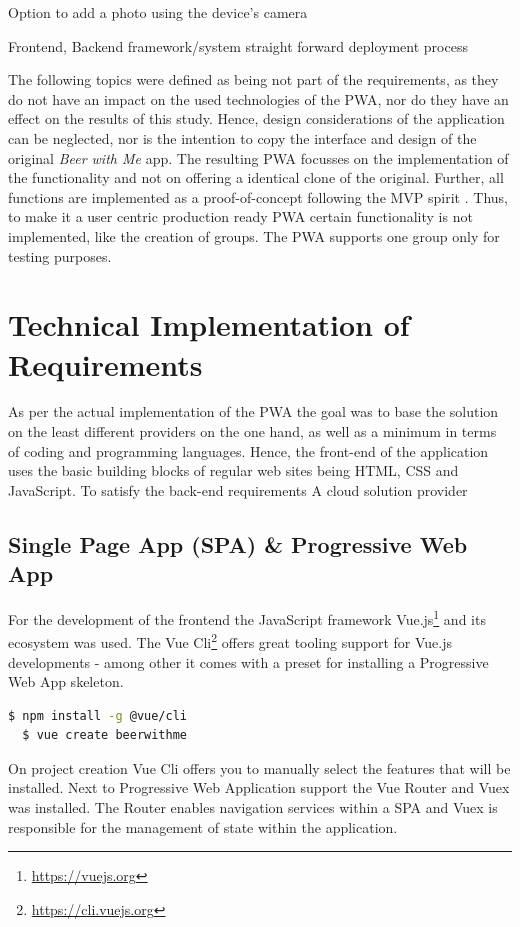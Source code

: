 Option to add a photo using the device’s camera


Frontend, Backend framework/system
straight forward deployment process

The following topics were defined as being not part of the requirements, as they do not have an impact on the used technologies of the PWA, nor do they have an effect on the results of this study. Hence, design considerations of the application can be neglected, nor is the intention to copy the interface and design of the original \textit{Beer with Me} app. The resulting PWA focusses on the implementation of the functionality and not on offering a identical clone of the original. Further, all functions are implemented as a proof-of-concept following the MVP spirit \citep{wikipediaMinimumViableProduct2019}. Thus, to make it a user centric production ready PWA certain functionality is not implemented, like the creation of groups. The PWA supports one group only for testing purposes.


\section{Technical Implementation of Requirements}
As per the actual implementation of the PWA the goal was to base the solution on the least different providers on the one hand, as well as a minimum in terms of coding and programming languages. Hence, the front-end of the application uses the basic building blocks of regular web sites being HTML, CSS and JavaScript. To satisfy the back-end requirements A cloud solution provider

\subsection{Single Page App (SPA) \& Progressive Web App}
For the development of the frontend the JavaScript framework Vue.js\footnote{\url{https://vuejs.org}} and its ecosystem was used. The Vue Cli\footnote{\url{https://cli.vuejs.org}} offers great tooling support for Vue.js developments - among other it comes with a preset for installing a Progressive Web App skeleton.

\begin{lstlisting}[language=bash, caption=Installation and project creation commands with the Vue Cli, label=lst:vue-cli]
  $ npm install -g @vue/cli
  $ vue create beerwithme
\end{lstlisting}

On project creation Vue Cli offers you to manually select the features that will be installed. Next to Progressive Web Application support the Vue Router and Vuex was installed. The Router enables navigation services within a SPA and Vuex is responsible for the management of state within the application.


